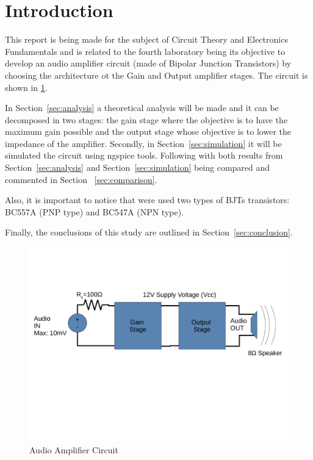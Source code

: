 \section{Introduction}
\label{sec:introduction}


\hspace{0,5cm} This report is being made for the subject of Circuit Theory and Electronics Fundamentals and is related to the fourth laboratory being its objective to develop an audio amplifier circuit (made of Bipolar Junction Transistors) by choosing the architecture ot the Gain and Output amplifier stages. The circuit is shown in \ref{fig:circuito}.
\par In Section~\ref{sec:analysis} a theoretical analysis will be made and it can be decomposed in two stages: the gain stage where the objective is to have the maximum gain possible and the output stage whose objective is to lower the impedance of the amplifier. Secondly, in Section~\ref{sec:simulation} it will be simulated the circuit using ngspice tools. Following with both results from Section~\ref{sec:analysis} and Section~\ref{sec:simulation} being compared and commented in Section ~\ref{sec:comparison}. 
\par Also, it is important to notice that were used two types of BJTs transistors: BC557A (PNP type) and BC547A (NPN type).
\par Finally, the conclusions of this study are outlined in Section~\ref{sec:conclusion}.

\begin{figure}[H] \centering
\includegraphics[width=1\linewidth]{circuito.pdf}
\caption{Audio Amplifier Circuit}
\label{fig:circuito}
\end{figure}


